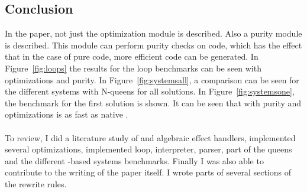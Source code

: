 \subsection{Conclusion}
In the paper, not just the optimization module is described. Also a purity module is described. This module can perform purity checks on code, which has the effect that in the case of pure code, more efficient \ocaml code can be generated. In Figure~\ref{fig:loops} the results for the loop benchmarks can be seen with optimizations and purity. In Figure~\ref{fig:systemsall}, a comparison can be seen for the different systems with N-queens for all solutions. In Figure~\ref{fig:systemsone}, the benchmark for the first solution is shown. It can be seen that \eff with purity and optimizations is as fast as native \ocaml.\\
\\
To review, I did a literature study of \eff and algebraic effect handlers, implemented several optimizations, implemented loop, interpreter, parser, part of the queens and the different \ocaml-based systems benchmarks. Finally I was also able to contribute to the writing of the paper itself. I wrote parts of several sections of the rewrite rules. 
